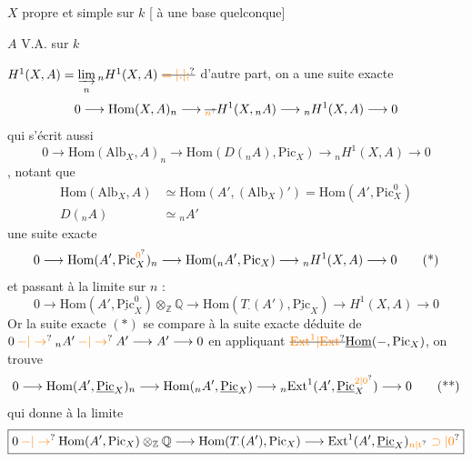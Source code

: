 $X$ propre et simple sur $k$ [ à une base quelconque]

$A$ V.A. sur $k$

$H^1(X,A)=\underset{n}{\underrightarrow{\lim}}\,{}_{n}H^1(X,A)\ \deleted{\unsure{=|.|;}}$ \enspace d'autre part, on a une suite exacte
\[
0\longrightarrow\mathrm{Hom}(X,A)_{n}\longrightarrow\deleted{{}_{\unsure{n}}}H^1(X,{}_{n}A)\longrightarrow{}_{n}H^1(X,A)\longrightarrow 0
\]
qui s'écrit aussi
\[
0\longrightarrow\mathrm{Hom}(\mathrm{Alb}_{X},A)_{n}\longrightarrow\mathrm{Hom}(D({}_{n}A),\mathrm{Pic}_{X})\longrightarrow{}_{n}H^1(X,A)\longrightarrow 0
\]
, notant que
\[
\begin{aligned}
\mathrm{Hom}(\mathrm{Alb}_{X},A)&\simeq\mathrm{Hom}(A',(\mathrm{Alb}_{X})')=\mathrm{Hom}(A',\mathrm{Pic}^{0}_{X})\\
D({}_{n}A)&\simeq{}_{n}A'
\end{aligned}
\]
une suite exacte
\makeatletter\tagsleft@true\makeatother
\[
0\longrightarrow\mathrm{Hom}(A',\mathrm{Pic}^{\unsure{0}}_{X})_{n}\longrightarrow\mathrm{Hom}({}_{n}A',\mathrm{Pic}_{X})\longrightarrow{}_{n}H^1(X,A)\longrightarrow0
\tag*{(*)}
\]
et passant à la limite  sur $n$ :
\[
\boxed{0\longrightarrow\mathrm{Hom}(A',\underline{\mathrm{Pic}}^{0}_{X})\otimes_{\mathbb Z}\mathbb Q\longrightarrow\mathrm{Hom}(T_{\cdot}(A'),\underline{\mathrm{Pic}}_{X})\longrightarrow H^1(X,A)\longrightarrow0}
\]
Or la suite exacte $(*)$ se compare à la suite exacte déduite de $0\mathbin{\unsure{-|\to}}{}_{n}A'\mathbin{\unsure{-|\to}} A'\longrightarrow A'\longrightarrow0$ en appliquant $\deleted{\unsure{\mathrm{Ext}^{1}|\mathrm{Ext}}}\underline{\mathrm{Hom}}(-,\mathrm{Pic}_{X})$, on trouve
\[
0\longrightarrow\mathrm{Hom}(A',\underline{\mathrm{Pic}}_{X})_{n}\longrightarrow\mathrm{Hom}({}_{n}A',\underline{\mathrm{Pic}}_{X})\longrightarrow{}_{n}\mathrm{Ext}^{1}(A',\underline{\mathrm{Pic}}^{\unsure{2|0}}_{X})\longrightarrow0
\tag*{(**)}
\]
qui donne à la limite
\[
\boxed{0\mathbin{\unsure{-|\to}}\mathrm{Hom}(A',\mathrm{Pic}_{X})\otimes_{\mathbb Z}\mathbb Q\longrightarrow\mathrm{Hom}(T_{\cdot}(A'),\mathrm{Pic}_{X})\longrightarrow\mathrm{Ext}^{1}(A',\underline{\mathrm{Pic}}_{X})_{\unsure{n|\mathrm{t}}}\ \unsure{\supset|0}}
\]
\makeatletter\tagsleft@false\makeatother
